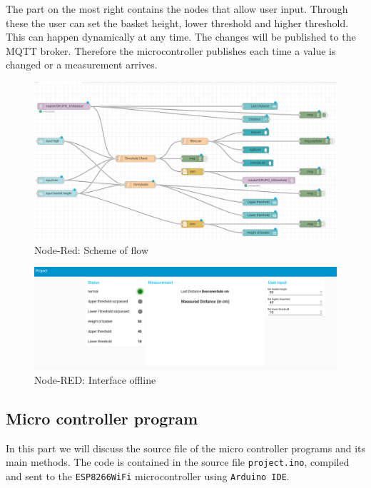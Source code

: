 \documentclass{article}
\begin{document}
The part on the most right contains the nodes that allow user input. Through these the
user can set the basket height, lower threshold and higher threshold. This can happen
dynamically at any time. The changes will be published to the MQTT broker. Therefore the microcontroller publishes each time a value is changed or a measurement arrives.

\begin{figure}
	\hspace{-1cm}
	\includegraphics[scale=1.2]{images/flowScheme.png}
	\caption{Node-Red: Scheme of flow}
	\label{flowScheme}
\end{figure}

\begin{figure}
	\centering \includegraphics[scale=0.2]{images/interface_offline_2.png}
	\caption{Node-RED: Interface offline}
	\label{inteface_offline}
\end{figure}

\newpage

\subsection{Micro controller program}

In this part we will discuss the source file of the micro controller programs and its main methods. The code is contained in the source file \texttt{project.ino}, compiled and sent to the \texttt{ESP8266WiFi} microcontroller using \texttt{Arduino IDE}.
\end{document}
